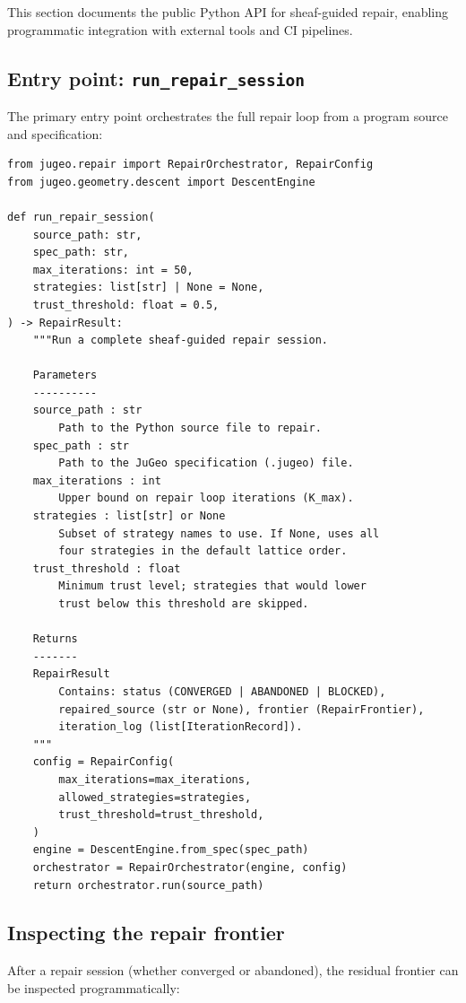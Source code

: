 \documentclass[11pt]{article}
\begin{document}
This section documents the public Python API for sheaf-guided repair,
enabling programmatic integration with external tools and CI pipelines.

\subsection{Entry point: \texttt{run\_repair\_session}}

The primary entry point orchestrates the full repair loop from a program
source and specification:

\begin{lstlisting}[style=jugeo-python,caption={Top-level repair API (repair\_api.py).}]
from jugeo.repair import RepairOrchestrator, RepairConfig
from jugeo.geometry.descent import DescentEngine

def run_repair_session(
    source_path: str,
    spec_path: str,
    max_iterations: int = 50,
    strategies: list[str] | None = None,
    trust_threshold: float = 0.5,
) -> RepairResult:
    """Run a complete sheaf-guided repair session.

    Parameters
    ----------
    source_path : str
        Path to the Python source file to repair.
    spec_path : str
        Path to the JuGeo specification (.jugeo) file.
    max_iterations : int
        Upper bound on repair loop iterations (K_max).
    strategies : list[str] or None
        Subset of strategy names to use. If None, uses all
        four strategies in the default lattice order.
    trust_threshold : float
        Minimum trust level; strategies that would lower
        trust below this threshold are skipped.

    Returns
    -------
    RepairResult
        Contains: status (CONVERGED | ABANDONED | BLOCKED),
        repaired_source (str or None), frontier (RepairFrontier),
        iteration_log (list[IterationRecord]).
    """
    config = RepairConfig(
        max_iterations=max_iterations,
        allowed_strategies=strategies,
        trust_threshold=trust_threshold,
    )
    engine = DescentEngine.from_spec(spec_path)
    orchestrator = RepairOrchestrator(engine, config)
    return orchestrator.run(source_path)
\end{lstlisting}

\subsection{Inspecting the repair frontier}

After a repair session (whether converged or abandoned), the residual
frontier can be inspected programmatically:
\end{document}
